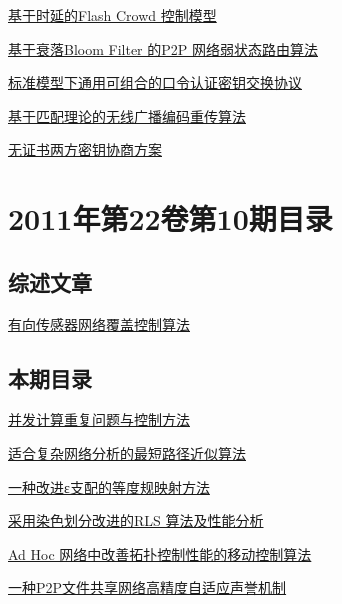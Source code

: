 \documentclass[a4paper]{article}
\begin{document}
\href{http://www.jos.org.cn/ch/reader/download_pdf.aspx?file_no=3922&year_id=2011&quarter_id=11&falg=1}{基于时延的Flash Crowd 控制模型}

\href{http://www.jos.org.cn/ch/reader/download_pdf.aspx?file_no=3863&year_id=2011&quarter_id=11&falg=1}{基于衰落Bloom Filter 的P2P 网络弱状态路由算法}

\href{http://www.jos.org.cn/ch/reader/download_pdf.aspx?file_no=3910&year_id=2011&quarter_id=11&falg=1}{标准模型下通用可组合的口令认证密钥交换协议}

\href{http://www.jos.org.cn/ch/reader/download_pdf.aspx?file_no=3938&year_id=2011&quarter_id=11&falg=1}{基于匹配理论的无线广播编码重传算法}

\href{http://www.jos.org.cn/ch/reader/download_pdf.aspx?file_no=3942&year_id=2011&quarter_id=11&falg=1}{无证书两方密钥协商方案}


\section{\textbf{2011年第22卷第10期目录}}
\subsection{综述文章}
\href{http://www.jos.org.cn/ch/reader/download_pdf.aspx?file_no=4080&year_id=2011&quarter_id=10&falg=1}{有向传感器网络覆盖控制算法}

\subsection{本期目录}
\href{http://www.jos.org.cn/ch/reader/download_pdf.aspx?file_no=3862&year_id=2011&quarter_id=10&falg=1}{并发计算重复问题与控制方法}

\href{http://www.jos.org.cn/ch/reader/download_pdf.aspx?file_no=3924&year_id=2011&quarter_id=10&falg=1}{适合复杂网络分析的最短路径近似算法}

\href{http://www.jos.org.cn/ch/reader/download_pdf.aspx?file_no=3933&year_id=2011&quarter_id=10&falg=1}{一种改进ε支配的等度规映射方法}

\href{http://www.jos.org.cn/ch/reader/download_pdf.aspx?file_no=3969&year_id=2011&quarter_id=10&falg=1}{采用染色划分改进的RLS 算法及性能分析}

\href{http://www.jos.org.cn/ch/reader/download_pdf.aspx?file_no=3940&year_id=2011&quarter_id=10&falg=1}{Ad Hoc 网络中改善拓扑控制性能的移动控制算法}

\href{http://www.jos.org.cn/ch/reader/download_pdf.aspx?file_no=3901&year_id=2011&quarter_id=10&falg=1}{一种P2P文件共享网络高精度自适应声誉机制}
\end{document}
